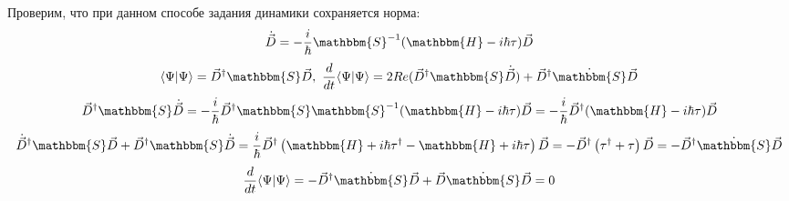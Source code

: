 Проверим, что при данном способе задания динамики сохраняется норма:
$$\dot{\vec{D}}=-\frac{i}{\hbar}\mathbbm{S}^{-1}(\mathbbm{H}-i\hbar\tau)\vec{D}$$
$$\myint{\Psi}{\Psi}=\vec{D}^{\dagger}\mathbbm{S}\vec{D},\ %
  \frac{d}{dt}\myint{\Psi}{\Psi}=2Re(\vec{D}^{\dagger}\mathbbm{S}\dot{\vec{D}})+\vec{D}^{\dagger}\dot{\mathbbm{S}}\vec{D}$$
$$\vec{D}^{\dagger}\mathbbm{S}\dot{\vec{D}}=%
  -\frac{i}{\hbar}\vec{D}^{\dagger}\mathbbm{S}\mathbbm{S}^{-1}(\mathbbm{H}-i\hbar\tau)\vec{D}=%
  -\frac{i}{\hbar}\vec{D}^{\dagger}(\mathbbm{H}-i\hbar\tau)\vec{D}$$
$$\dot{\vec{D}}^{\dagger}\mathbbm{S}\vec{D}+\vec{D}^{\dagger}\mathbbm{S}\dot{\vec{D}}=%
  \frac{i}{\hbar}\vec{D}^{\dagger}\left(\mathbbm{H}+i\hbar\tau^{\dagger}-\mathbbm{H}+i\hbar\tau\right)\vec{D}=%
  -\vec{D}^{\dagger}\left(\tau^{\dagger}+\tau\right)\vec{D}=-\vec{D}^{\dagger}\dot{\mathbbm{S}}\vec{D}$$
$$\frac{d}{dt}\myint{\Psi}{\Psi}=-\vec{D}^{\dagger}\dot{\mathbbm{S}}\vec{D}+\vec{D}\dot{\mathbbm{S}}\vec{D}=0$$

